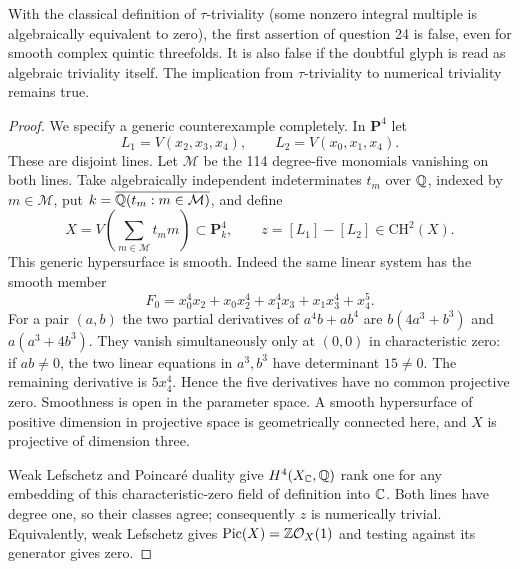 \begin{theorem}\label{thm:B1c}
With the classical definition of $\tau$-triviality (some nonzero integral multiple is
algebraically equivalent to zero), the first assertion of question 24 is
false, even for smooth complex quintic threefolds. It is also false if the
doubtful glyph is read as algebraic triviality itself. The implication
from $\tau$-triviality to numerical triviality remains true.
\end{theorem}
\begin{proof}
We specify a generic counterexample completely. In $\mathbf P^4$ let
\[
 L_1=V(x_2,x_3,x_4),\qquad L_2=V(x_0,x_1,x_4).
\]
These are disjoint lines. Let $\mathcal M$ be the 114 degree-five
monomials vanishing on both lines. Take algebraically independent
indeterminates $t_m$ over ${\mathbb{Q}}$, indexed by $m\in\mathcal M$, put
$k=\overline{{\mathbb{Q}}(t_m:m\in\mathcal M)}$, and define
\[
 X=V\left(\sum_{m\in\mathcal M}t_m m\right)\subset\mathbf P^4_k,
 \qquad z=[L_1]-[L_2]\in\mathrm{CH}^2(X).
\]
This generic hypersurface is smooth. Indeed the same linear system has
the smooth member
\[
 F_0=x_0^4x_2+x_0x_2^4+x_1^4x_3+x_1x_3^4+x_4^5.
\]
For a pair $(a,b)$ the two partial derivatives of $a^4b+ab^4$ are
$b(4a^3+b^3)$ and $a(a^3+4b^3)$. They vanish simultaneously only at
$(0,0)$ in characteristic zero: if $ab\ne0$, the two linear equations
in $a^3,b^3$ have determinant $15\ne0$. The remaining derivative is
$5x_4^4$. Hence the five derivatives have no common projective zero.
Smoothness is open in the parameter space. A smooth hypersurface of
positive dimension in projective space is geometrically connected here,
and $X$ is projective of dimension three.

Weak Lefschetz and Poincar\'e duality give $H^4(X_{\mathbb{C}},{\mathbb{Q}})$ rank one for
any embedding of this characteristic-zero field of definition into ${\mathbb{C}}$.
Both lines have degree one, so their classes agree; consequently $z$ is
numerically trivial. Equivalently, weak Lefschetz gives
$\operatorname{Pic}(X)={\mathbb{Z}}\mathcal O_X(1)$ and testing against its
generator gives zero.


\end{proof}
